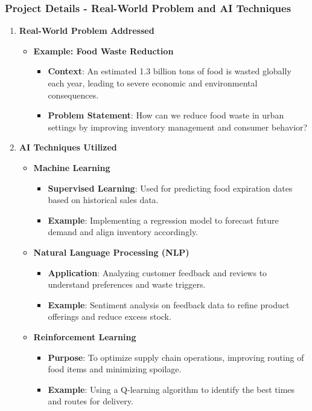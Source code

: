 \documentclass[aspectratio=169]{beamer}
\begin{document}
\begin{frame}[fragile]
    \frametitle{Project Details - Real-World Problem and AI Techniques}
    \begin{enumerate}
        \item \textbf{Real-World Problem Addressed}
        \begin{itemize}
            \item \textbf{Example: Food Waste Reduction}
            \begin{itemize}
                \item \textbf{Context}: An estimated 1.3 billion tons of food is wasted globally each year, leading to severe economic and environmental consequences.
                \item \textbf{Problem Statement}: How can we reduce food waste in urban settings by improving inventory management and consumer behavior?
            \end{itemize}
        \end{itemize}
        \item \textbf{AI Techniques Utilized}
        \begin{itemize}
            \item \textbf{Machine Learning}
                \begin{itemize}
                    \item \textbf{Supervised Learning}: Used for predicting food expiration dates based on historical sales data.
                    \item \textbf{Example}: Implementing a regression model to forecast future demand and align inventory accordingly.
                \end{itemize}
            \item \textbf{Natural Language Processing (NLP)}
                \begin{itemize}
                    \item \textbf{Application}: Analyzing customer feedback and reviews to understand preferences and waste triggers.
                    \item \textbf{Example}: Sentiment analysis on feedback data to refine product offerings and reduce excess stock.
                \end{itemize}
            \item \textbf{Reinforcement Learning}
                \begin{itemize}
                    \item \textbf{Purpose}: To optimize supply chain operations, improving routing of food items and minimizing spoilage.
                    \item \textbf{Example}: Using a Q-learning algorithm to identify the best times and routes for delivery.
                \end{itemize}
        \end{itemize}
    \end{enumerate}
\end{frame}
\end{document}

